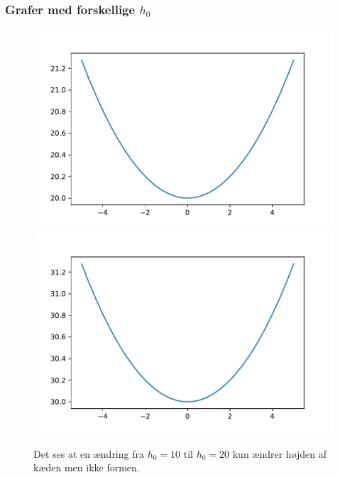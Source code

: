 \begin{frame}
\frametitle{Grafer med forskellige $h_0$}

\begin{figure}[h!]
\includegraphics[scale=0.3]{img/fig1}
\includegraphics[scale=0.3]{img/fig2}
\caption{Det ses at en ændring fra $h_0=10$ til $h_0=20$ kun ændrer højden af kæden men ikke formen.}
\end{figure}
\end{frame}

